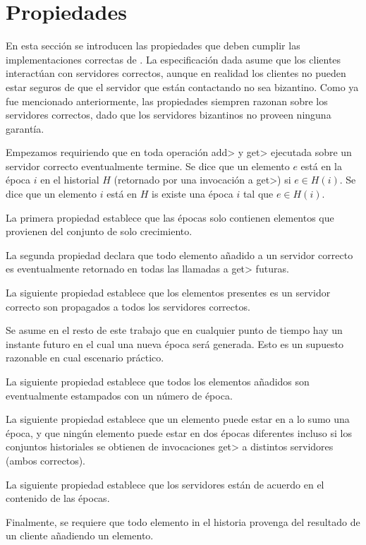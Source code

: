\section{Propiedades}\label{sec:properties}
En esta sección se introducen las propiedades que deben cumplir las implementaciones
correctas de \setchain.
La especificación dada asume que los clientes interactúan con servidores correctos,
aunque en realidad los clientes no pueden estar seguros de que el servidor que están
contactando no sea bizantino.
Como ya fue mencionado anteriormente, las propiedades siempren razonan sobre los servidores
correctos, dado que los servidores bizantinos no proveen ninguna garantía.
%

Empezamos requiriendo que en \setchain toda operación \<add> y \<get> ejecutada sobre un servidor
correcto eventualmente termine.
Se dice que un elemento $e$ está en la época $i$ en el historial $H$ (retornado por una invocación
a \<get>) si $e \in H(i)$.
Se dice que un elemento $i$ está en $H$ is existe una época $i$ tal que $e \in H(i)$.

La primera propiedad establece que las épocas solo contienen elementos que provienen del conjunto
de solo crecimiento.

La segunda propiedad declara que todo elemento añadido a un servidor correcto es eventualmente
retornado en todas las llamadas a \<get> futuras.

La siguiente propiedad establece que los elementos presentes es un servidor correcto son propagados
a todos los servidores correctos.

Se asume en el resto de este trabajo que en cualquier punto de tiempo hay un instante futuro en el
cual una nueva época será generada. Esto es un supuesto razonable en cual escenario práctico.

La siguiente propiedad establece que todos los elementos añadidos son eventualmente estampados
con un número de época.

La siguiente propiedad establece que un elemento puede estar en a lo sumo una época,
y que ningún elemento puede estar en dos épocas diferentes incluso si los conjuntos historiales se
obtienen de invocaciones \<get> a distintos servidores (ambos correctos).

La siguiente propiedad establece que los servidores están de acuerdo en el contenido
de las épocas.

Finalmente, se requiere que todo elemento in el historia provenga del resultado de un cliente
añadiendo un elemento.


